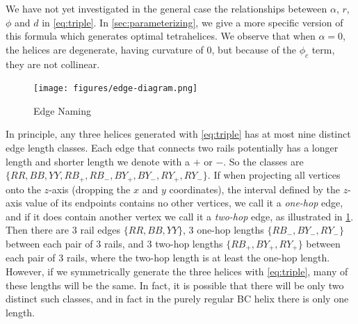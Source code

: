 \documentclass[twocolumn,10pt]{asme2ej}
\begin{document}
We have not yet investigated in the general case the relationships beteween
$\alpha$, $r$, $\phi$ and $d$ in \cref{eq:triple}.
In \cref{sec:parameterizing}, we give a more specific version of this formula which
generates optimal tetrahelices.
We observe that when $\alpha = 0$, the helices are degenerate, having curvature of $0$,
but because of the $\phi_c$ term, they are not collinear.

\begin{figure}
  \centering
     \texttt{[image: figures/edge-diagram.png]}
     \caption{Edge Naming}
  \label{fig:naming}
\end{figure}

In principle, any three helices generated with \cref{eq:triple}
has at most nine distinct edge length classes. Each edge that connects
two rails potentially has a longer length and shorter length we denote with
a $+$ or $-$. So the classes are $\{ RR, BB, YY, RB_+, RB_-, BY_+, BY_-, RY_+, RY_- \}$.
If when projecting all vertices onto the $z$-axis (dropping the $x$ and $y$ coordinates),
the interval
defined by the $z$-axis value of its endpoints contains no other vertices,
we call it a \emph{one-hop} edge, and if it does contain another vertex we
call it a \emph{two-hop} edge, as illustrated in \cref{fig:naming}.
Then there are 
3 rail edges $\{ RR, BB, YY\}$,
3 one-hop lengths $\{ RB_-, BY_-, RY_- \}$ between each pair of 3 rails,
and 3 two-hop
lengths $\{ RB_{+}, BY_+, RY_+ \}$ between each pair of 3 rails,
where the two-hop length is at least the one-hop length.
However, if we symmetrically generate the three helices  with \cref{eq:triple},
many of these lengths will be the same.
In fact, it is possible that there
will be only two distinct such classes, and in fact in  the purely regular BC helix there is only one length.
\end{document}
